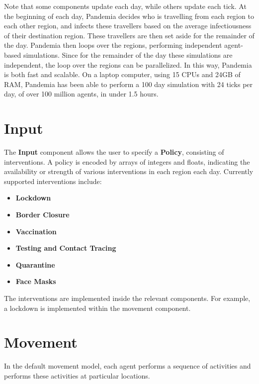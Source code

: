 \documentclass[10pt,letterpaper]{article}
\begin{document}
Note that some components update each day, while others update each tick. At the beginning of each day, Pandemia decides who is travelling from each region to each other region, and infects these travellers based on the average infectiousness of their destination region. These travellers are then set aside for the remainder of the day. Pandemia then loops over the regions, performing independent agent-based simulations. Since for the remainder of the day these simulations are independent, the loop over the regions can be parallelized. In this way, Pandemia is both fast and scalable. On a laptop computer, using 15 CPUs and 24GB of RAM, Pandemia has been able to perform a 100 day simulation with 24 ticks per day, of over 100 million agents, in under 1.5 hours.

\section{Input}\label{sec:input}

The \textbf{Input} component allows the user to specify a \textbf{Policy}, consisting of interventions. A policy is encoded by arrays of integers and floats, indicating the availability or strength of various interventions in each region each day. Currently supported interventions include:
\begin{itemize}
\item \textbf{Lockdown}
\item \textbf{Border Closure}
\item \textbf{Vaccination}
\item \textbf{Testing and Contact Tracing}
\item \textbf{Quarantine}
\item \textbf{Face Masks}
\end{itemize}
The interventions are implemented inside the relevant components. For example, a lockdown is implemented within the movement component.

\section{Movement}

In the default movement model, each agent performs a sequence of activities and performs these activities at particular locations.
\end{document}
